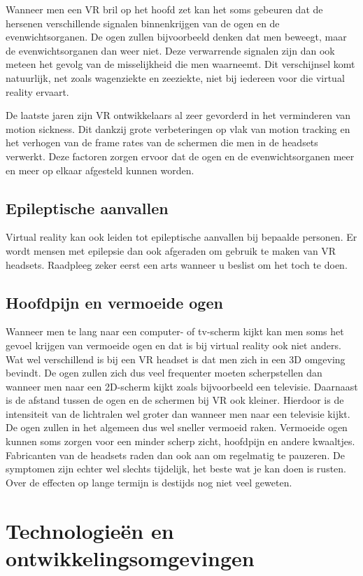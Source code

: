 Wanneer men een VR bril op het hoofd zet kan het soms gebeuren dat de hersenen verschillende signalen binnenkrijgen van de ogen en de evenwichtsorganen. De ogen zullen bijvoorbeeld denken dat men beweegt, maar de evenwichtsorganen dan weer niet. Deze verwarrende signalen zijn dan ook meteen het gevolg van de misselijkheid die men waarneemt. Dit verschijnsel komt natuurlijk, net zoals wagenziekte en zeeziekte, niet bij iedereen voor die virtual reality ervaart.

\pagebreak
De laatste jaren zijn VR ontwikkelaars al zeer gevorderd in het verminderen van motion sickness. Dit dankzij grote verbeteringen op vlak van motion tracking en het verhogen van de frame rates van de schermen die men in de headsets verwerkt. Deze factoren zorgen ervoor dat de ogen en de evenwichtsorganen meer en meer op elkaar afgesteld kunnen worden.

\subsection{Epileptische aanvallen}
Virtual reality kan ook leiden tot epileptische aanvallen bij bepaalde personen. Er wordt mensen met epilepsie dan ook afgeraden om gebruik te maken van VR headsets. Raadpleeg zeker eerst een arts wanneer u beslist om het toch te doen.

\subsection{Hoofdpijn en vermoeide ogen}
Wanneer men te lang naar een computer- of tv-scherm kijkt kan men soms het gevoel krijgen van vermoeide ogen en dat is bij virtual reality ook niet anders. Wat wel verschillend is bij een VR headset is dat men zich in een 3D omgeving bevindt. De ogen zullen zich dus veel frequenter moeten scherpstellen dan wanneer men naar een 2D-scherm kijkt zoals bijvoorbeeld een televisie. Daarnaast is de afstand tussen de ogen en de schermen bij VR ook kleiner. Hierdoor is de intensiteit van de lichtralen wel groter dan wanneer men naar een televisie kijkt. De ogen zullen in het algemeen dus wel sneller vermoeid raken. Vermoeide ogen kunnen soms zorgen voor een minder scherp zicht, hoofdpijn en andere kwaaltjes. Fabricanten van de headsets raden dan ook aan om regelmatig te pauzeren. De symptomen zijn echter wel slechts tijdelijk, het beste wat je kan doen is rusten. Over de effecten op lange termijn is destijds nog niet veel geweten.


\section{Technologieën en ontwikkelingsomgevingen}
